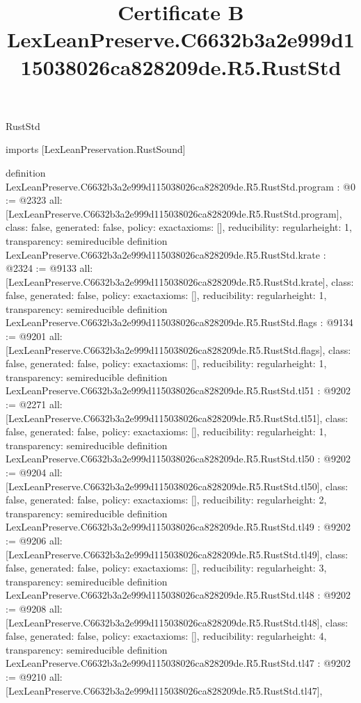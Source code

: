 \begin{lexlean}{RustStd}
\title{Certificate B LexLeanPreserve.C6632b3a2e999d115038026ca828209de.R5.RustStd}
\begin{coremodule}
imports [LexLeanPreservation.RustSound]

definition LexLeanPreserve.C6632b3a2e999d115038026ca828209de.R5.RustStd.program : @0 := @2323 {
  all: [LexLeanPreserve.C6632b3a2e999d115038026ca828209de.R5.RustStd.program],
  class: false,
  generated: false,
  policy: exact{axioms: []},
  reducibility: regular{height: 1},
  transparency: semireducible
}
definition LexLeanPreserve.C6632b3a2e999d115038026ca828209de.R5.RustStd.krate : @2324 := @9133 {
  all: [LexLeanPreserve.C6632b3a2e999d115038026ca828209de.R5.RustStd.krate],
  class: false,
  generated: false,
  policy: exact{axioms: []},
  reducibility: regular{height: 1},
  transparency: semireducible
}
definition LexLeanPreserve.C6632b3a2e999d115038026ca828209de.R5.RustStd.flags : @9134 := @9201 {
  all: [LexLeanPreserve.C6632b3a2e999d115038026ca828209de.R5.RustStd.flags],
  class: false,
  generated: false,
  policy: exact{axioms: []},
  reducibility: regular{height: 1},
  transparency: semireducible
}
definition LexLeanPreserve.C6632b3a2e999d115038026ca828209de.R5.RustStd.tl51 : @9202 := @2271 {
  all: [LexLeanPreserve.C6632b3a2e999d115038026ca828209de.R5.RustStd.tl51],
  class: false,
  generated: false,
  policy: exact{axioms: []},
  reducibility: regular{height: 1},
  transparency: semireducible
}
definition LexLeanPreserve.C6632b3a2e999d115038026ca828209de.R5.RustStd.tl50 : @9202 := @9204 {
  all: [LexLeanPreserve.C6632b3a2e999d115038026ca828209de.R5.RustStd.tl50],
  class: false,
  generated: false,
  policy: exact{axioms: []},
  reducibility: regular{height: 2},
  transparency: semireducible
}
definition LexLeanPreserve.C6632b3a2e999d115038026ca828209de.R5.RustStd.tl49 : @9202 := @9206 {
  all: [LexLeanPreserve.C6632b3a2e999d115038026ca828209de.R5.RustStd.tl49],
  class: false,
  generated: false,
  policy: exact{axioms: []},
  reducibility: regular{height: 3},
  transparency: semireducible
}
definition LexLeanPreserve.C6632b3a2e999d115038026ca828209de.R5.RustStd.tl48 : @9202 := @9208 {
  all: [LexLeanPreserve.C6632b3a2e999d115038026ca828209de.R5.RustStd.tl48],
  class: false,
  generated: false,
  policy: exact{axioms: []},
  reducibility: regular{height: 4},
  transparency: semireducible
}
definition LexLeanPreserve.C6632b3a2e999d115038026ca828209de.R5.RustStd.tl47 : @9202 := @9210 {
  all: [LexLeanPreserve.C6632b3a2e999d115038026ca828209de.R5.RustStd.tl47],
}
\end{coremodule}
\end{lexlean}
